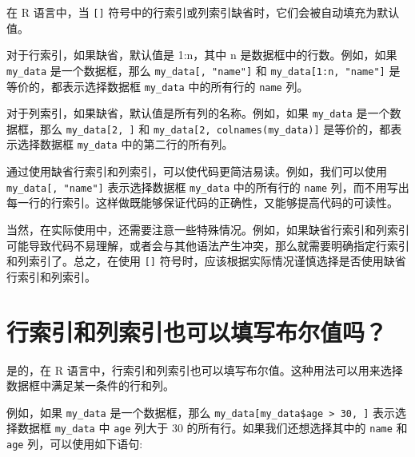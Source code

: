 \documentclass[
  letterpaper,
  DIV=11,
  numbers=noendperiod]{scrreprt}
\newenvironment{Shaded}{\begin{snugshade}}{\end{snugshade}}
\newcommand{\AttributeTok}[1]{\textcolor[rgb]{0.40,0.45,0.13}{#1}}
\newcommand{\DecValTok}[1]{\textcolor[rgb]{0.68,0.00,0.00}{#1}}
\newcommand{\FunctionTok}[1]{\textcolor[rgb]{0.28,0.35,0.67}{#1}}
\newcommand{\NormalTok}[1]{\textcolor[rgb]{0.00,0.23,0.31}{#1}}
\newcommand{\OtherTok}[1]{\textcolor[rgb]{0.00,0.23,0.31}{#1}}
\newcommand{\SpecialCharTok}[1]{\textcolor[rgb]{0.37,0.37,0.37}{#1}}
\newcommand{\StringTok}[1]{\textcolor[rgb]{0.13,0.47,0.30}{#1}}
\begin{document}
在 R 语言中，当 \texttt{{[}{]}}
符号中的行索引或列索引缺省时，它们会被自动填充为默认值。

对于行索引，如果缺省，默认值是 1:n，其中 n 是数据框中的行数。例如，如果
\texttt{my\_data} 是一个数据框，那么 \texttt{my\_data{[},\ "name"{]}} 和
\texttt{my\_data{[}1:n,\ "name"{]}} 是等价的，都表示选择数据框
\texttt{my\_data} 中的所有行的 \texttt{name} 列。

对于列索引，如果缺省，默认值是所有列的名称。例如，如果 \texttt{my\_data}
是一个数据框，那么 \texttt{my\_data{[}2,\ {]}} 和
\texttt{my\_data{[}2,\ colnames(my\_data){]}} 是等价的，都表示选择数据框
\texttt{my\_data} 中的第二行的所有列。

通过使用缺省行索引和列索引，可以使代码更简洁易读。例如，我们可以使用
\texttt{my\_data{[},\ "name"{]}} 表示选择数据框 \texttt{my\_data}
中的所有行的 \texttt{name}
列，而不用写出每一行的行索引。这样做既能够保证代码的正确性，又能够提高代码的可读性。

当然，在实际使用中，还需要注意一些特殊情况。例如，如果缺省行索引和列索引可能导致代码不易理解，或者会与其他语法产生冲突，那么就需要明确指定行索引和列索引了。总之，在使用
\texttt{{[}{]}}
符号时，应该根据实际情况谨慎选择是否使用缺省行索引和列索引。

\section{行索引和列索引也可以填写布尔值吗？}\label{ux884cux7d22ux5f15ux548cux5217ux7d22ux5f15ux4e5fux53efux4ee5ux586bux5199ux5e03ux5c14ux503cux5417}

是的，在 R
语言中，行索引和列索引也可以填写布尔值。这种用法可以用来选择数据框中满足某一条件的行和列。

例如，如果 \texttt{my\_data} 是一个数据框，那么
\texttt{my\_data{[}my\_data\$age\ \textgreater{}\ 30,\ {]}}
表示选择数据框 \texttt{my\_data} 中 \texttt{age} 列大于 30
的所有行。如果我们还想选择其中的 \texttt{name} 和 \texttt{age}
列，可以使用如下语句:

\begin{Shaded}
\end{Shaded}
\end{document}
